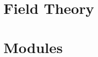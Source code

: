\documentclass[12pt, a4paper, oneside, openright, titlepage]{book}
\begin{document}
\part{Field Theory}















\part{Modules}


















\end{document}
